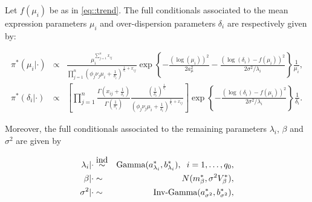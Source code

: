 Let $f(\mu_i)$ be as in \ref{eq::trend}. The full conditionals associated to the mean expression parameters $\mu_i$ and over-dispersion parameters $\delta_i$ are respectively given by:

\begin{footnotesize} \begin{eqnarray} \label{eq::FullCondMuDelta}
\pi^*(\mu_i|\cdot) & \propto & \frac{\mu_i^{\sum_{j=1}^n{}x_{ij}}}{\prod_{j=1}^n{}(\phi_j\nu_j\mu_i+\frac{1}{\delta_i})^{\frac{1}{\delta_i}+x_{ij}}} \exp\left\{-\frac{(\log(\mu_i))^2}{2a_\mu^2}-\frac{(\log(\delta_i)-f(\mu_i))^2}{2\sigma^2 / \lambda_i }\right\} \frac{1}{\mu_i}, \\
\pi^*(\delta_i|\cdot) & \propto & \left[\prod_{j=1}^n\frac{\Gamma(x_{ij}+\frac{1}{\delta_i})}{\Gamma(\frac{1}{\delta_i})}\frac{(\frac{1}{\delta_i})^{\frac{1}{\delta_i}}}{(\phi_j\nu_j\mu_i+\frac{1}{\delta_i})^{\frac{1}{\delta_i}+x_{ij}}}\right] \exp\left\{-\frac{(\log(\delta_i)-f(\mu_i))^2}{2\sigma^2 / \lambda_i}\right\} \frac{1}{\delta_i}.
\end{eqnarray} \end{footnotesize}

Moreover, the full conditionals associated to the remaining parameters $\lambda_i$, $\beta$ and $\sigma^2$ are given by 

\begin{eqnarray}
\lambda_i|\cdot & \stackrel{\mbox{ind}}{\sim} & \text{Gamma}(a^*_{\lambda_i},b^*_{\lambda_i}), \hspace{0.2cm} i = 1, \ldots, q_0, \\
\beta|\cdot & \sim & N(m^*_{\beta}, \sigma^2 V^*_{\beta}), \\
\sigma^2|\cdot & \sim & \text{Inv-Gamma}(a^*_{\sigma^2},b^*_{\sigma^2}),
\end{eqnarray} 


